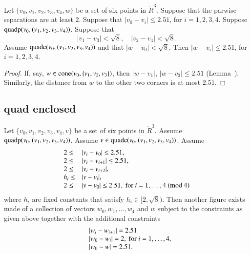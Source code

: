 \newpage

\begin{lemma} 
Let $\{v_0,v_1,v_2,v_3,v_4,w\}$ be a set of six points in
$\ring{R}^3$.  Suppose that the parwise separations are at
least $2$.  
Suppose that $|v_0-v_i|\le 2.51$, for $i=1,2,3,4$.
Suppose ${\operatorname{quadp}}(v_0,(v_1,v_2,v_3,v_4))$.
Suppose that
  $$|v_1-v_3|<\sqrt8,\quad |v_2-v_4| <\sqrt8.$$
Assume ${\operatorname{quadc}}(v_0,(v_1,v_2,v_3,v_4))$ and that $|w-v_0|<\sqrt8$.
Then $|w-v_i|\le 2.51$, for $i=1,2,3,4$.
\end{lemma}


\begin{proof}
If, say, $w\in {\operatorname{cone}}(v_0,\{v_1,v_2,v_3\})$, then
$|w-v_1|$, $|w-v_3|\le 2.51$ (Lemma~).
 Similarly, the distance from
$w$ to the other two corners is at most $2.51$.
\end{proof}

\newpage
\subsection{quad enclosed}


\begin{lemma}
Let $\{v_0,v_1,v_2,v_3,v_4,v\}$ be a set of six points in
$\ring{R}^3$.  Assume ${\operatorname{quadp}}(v_0,(v_1,v_2,v_3,v_4))$.
Assume $v\in {\operatorname{quadc}}(v_0,(v_1,v_2,v_3,v_4))$.
Assume 
    $$\begin{array}{lll}
    2\le &|v_i-v_0|\le 2.51,\\
    2\le&|v_i-v_{i+1}|\le 2.51, \\
    2\le&|v_i-v_{i+2}|,\\
    h_i\le &|v-v_i|, \\
    2\le &|v-v_0|\le 2.51, \hbox{ for }
        i=1,\ldots,4 \ (\hbox{mod } 4)\\
    \end{array}
    $$
where $h_i$ are fixed constants that satisfy
$h_i\in[2,\sqrt{8})$.  
Then another figure exists made of
a collection of vectors $w_0,w_1,\ldots,w_4$ and $w$ subject to
the constraints as given above together with the additional constraints
    $$\begin{array}{lll}
    &|w_i-w_{i+1}|=2.51\\
    &|w_0-w_i|=2, \hbox { for } i=1,\ldots,4,\\
    &|w_0-w|=2.51.
    \end{array}
    $$
\end{lemma}

